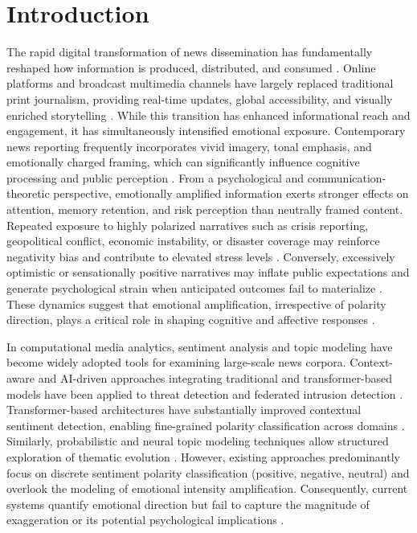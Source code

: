 \documentclass[final,1p,times]{elsarticle}
\begin{document}
\section{Introduction}
\label{introduction}

The rapid digital transformation of news dissemination has fundamentally reshaped how information is produced, distributed, and consumed \cite{newman2025digital}. Online platforms and broadcast multimedia channels have largely replaced traditional print journalism, providing real-time updates, global accessibility, and visually enriched storytelling \cite{lamai2025broadcast}. While this transition has enhanced informational reach and engagement, it has simultaneously intensified emotional exposure. Contemporary news reporting frequently incorporates vivid imagery, tonal emphasis, and emotionally charged framing, which can significantly influence cognitive processing and public perception \cite{rakhimboeva2025application}. From a psychological and communication-theoretic perspective, emotionally amplified information exerts stronger effects on attention, memory retention, and risk perception than neutrally framed content. Repeated exposure to highly polarized narratives such as crisis reporting, geopolitical conflict, economic instability, or disaster coverage may reinforce negativity bias and contribute to elevated stress levels \cite{harliantara2026media,burton2025anxiety,soroka2026negativity}. Conversely, excessively optimistic or sensationally positive narratives may inflate public expectations and generate psychological strain when anticipated outcomes fail to materialize \cite{stroud2010polarization}. These dynamics suggest that emotional amplification, irrespective of polarity direction, plays a critical role in shaping cognitive and affective responses \cite{xu2025emotion}.

In computational media analytics, sentiment analysis and topic modeling have become widely adopted tools for examining large-scale news corpora. Context-aware and AI-driven approaches integrating traditional and transformer-based models have been applied to threat detection and federated intrusion detection \cite{contextawarethreat2024,fflids2024}. Transformer-based architectures have substantially improved contextual sentiment detection, enabling fine-grained polarity classification across domains \cite{vaswani2017attention,devlin2019bert,liu2019roberta}. Similarly, probabilistic and neural topic modeling techniques allow structured exploration of thematic evolution \cite{dubey2025contextualized}. However, existing approaches predominantly focus on discrete sentiment polarity classification (positive, negative, neutral) and overlook the modeling of emotional intensity amplification. Consequently, current systems quantify emotional direction but fail to capture the magnitude of exaggeration or its potential psychological implications \cite{kumar2025cross}.
\end{document}
